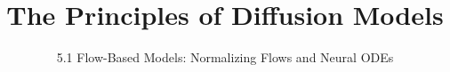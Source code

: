 ﻿%

\graphicspath{{../images/}}
\title{The Principles of Diffusion Models}
\subtitle{5.1 Flow-Based Models: Normalizing Flows and Neural ODEs}


\begin{frame}
    \titlepage
\end{frame}


